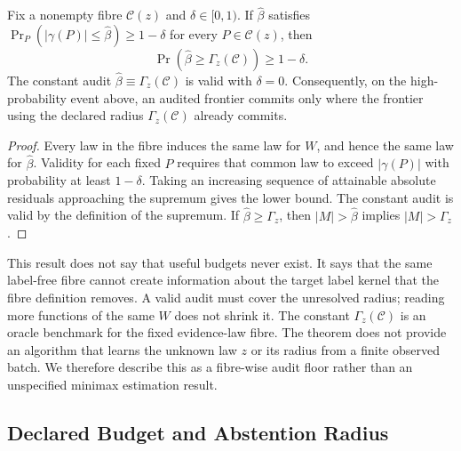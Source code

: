 \begin{theorem}
\label{thm:compact-beta-minimax}
Fix a nonempty fibre $\mathcal C(z)$ and $\delta\in[0,1)$. If
$\widehat\beta$ satisfies
$\Pr_P(|\gamma(P)|\le\widehat\beta)\ge1-\delta$ for every
$P\in\mathcal C(z)$, then
\[
 \Pr\!\left(\widehat\beta\ge\Gamma_z(\mathcal C)\right)\ge1-\delta.
\]
The constant audit $\widehat\beta\equiv\Gamma_z(\mathcal C)$ is valid with $\delta=0$.
Consequently, on the high-probability event above, an audited frontier commits only where the
frontier using the declared radius $\Gamma_z(\mathcal C)$ already commits.
\end{theorem}
\begin{proof}
Every law in the fibre induces the same law for $W$, and hence the same law for
$\widehat\beta$. Validity for each fixed $P$ requires that common law to exceed
$|\gamma(P)|$ with probability at least $1-\delta$. Taking an increasing sequence of attainable
absolute residuals approaching the supremum gives the lower bound. The constant audit is valid by the
definition of the supremum. If $\widehat\beta\ge\Gamma_z$, then
$|M|>\widehat\beta$ implies $|M|>\Gamma_z$.
\end{proof}

This result does not say that useful budgets never exist. It says that the same label-free fibre
cannot create information about the target label kernel that the fibre definition removes. A valid
audit must cover the unresolved radius; reading more functions of the same $W$ does not shrink it.
The constant $\Gamma_z(\mathcal C)$ is an oracle benchmark for the fixed evidence-law fibre.
The theorem does not provide an algorithm that learns the unknown law $z$ or its radius from a
finite observed batch. We therefore describe this as a fibre-wise audit floor rather than an
unspecified minimax estimation result.

\subsection{Declared Budget and Abstention Radius}

